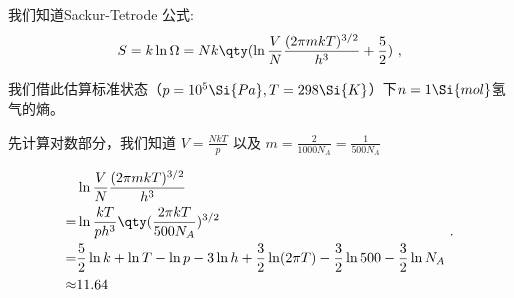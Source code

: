 


我们知道Sackur-Tetrode 公式:
\begin{equation}
S = k\ln \Omega  = Nk \qty(\ln \frac{V}{N} \frac{(2\pi mkT)^{3/2}}{h^3} + \frac52)~,
\end{equation}

我们借此估算标准状态（$p=10^5 \Si{Pa}, T=298\Si{K}$）下$n=1 \Si{mol}$氢气的熵。

先计算对数部分，我们知道 $V=\frac{NkT}{p}$ 以及 $m = \frac{2}{1000 N_A} = \frac{1}{500 N_A}$

$$
\begin{aligned}
 & \ln \frac{V}{N} \frac{(2\pi mkT)^{3/2}}{h^3} \\
 = & \ln \frac{kT}{p h^3} \qty(\frac{2\pi kT}{500 N_A})^{3/2}\\
 = & \frac{5}{2} \ln k + \ln T - \ln p - 3 \ln h + \frac{3}{2} \ln (2 \pi T) - \frac{3}{2} \ln 500 - \frac{3}{2} \ln N_A \\
 \approx & 11.64\\
\end{aligned}~.
$$